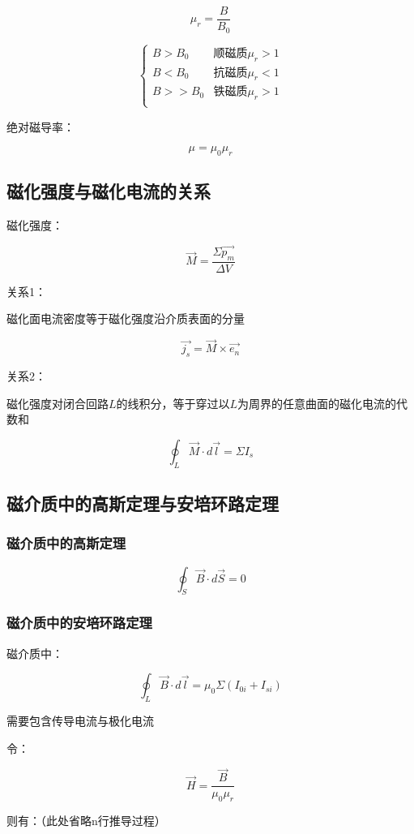 \documentclass{ctexart}
\begin{document}
$$\mu_r=\frac{B}{B_0}$$

$$\begin{cases}
	B>B_0& \text{顺磁质}\mu_r>1\\
	B<B_0& \text{抗磁质}\mu_r<1\\
	B>>B_0& \text{铁磁质}\mu_r>1\\
\end{cases}$$

绝对磁导率：

$$\mu=\mu_0\mu_r$$

\subsection{磁化强度与磁化电流的关系}

磁化强度：

$$\vec{M}=\frac{\Sigma\vec{p_m}}{\Delta V}$$

关系1：

磁化面电流密度等于磁化强度沿介质表面的分量

$$\vec{j_s}=\vec{M}\times \vec{e_n}$$

关系2：

磁化强度对闭合回路$L$的线积分，等于穿过以$L$为周界的任意曲面的磁化电流的代数和

$$\oint_{L}\vec{M}\cdot d\vec{l}=\Sigma I_s$$

\subsection{磁介质中的高斯定理与安培环路定理}

\subsubsection{磁介质中的高斯定理}

$$\oint_{S}\vec{B}\cdot d\vec{S}=0$$

\subsubsection{磁介质中的安培环路定理}

磁介质中：

$$\oint_{L}\vec{B}\cdot d\vec{l}=\mu_0\Sigma (I_{0i}+I_{si})$$

需要包含传导电流与极化电流

令：

$$\vec{H}=\frac{\vec{B}}{\mu_0\mu_r}$$

则有：（此处省略n行推导过程）
\end{document}
